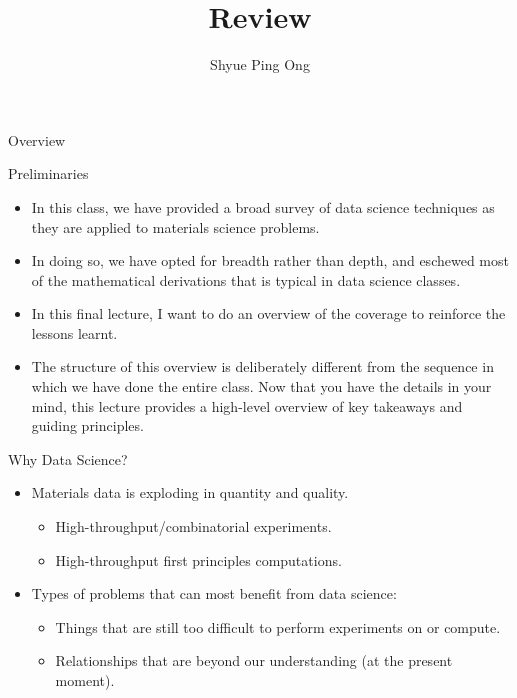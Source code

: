 \documentclass[aspectratio=169]{beamer}
\title[\classname Review]{\classname Review}
\author{Shyue Ping Ong}
\institute[UCSD]{Aiiso Yufeng Li Family Department of Chemical and Nano Engineering\\
University of California, San Diego\\\url{http://materialsvirtuallab.org}}
\date{}
\begin{document}
\begin{frame}
    \titlepage %
\end{frame}


\begin{frame}{Overview}
    \tableofcontents
\end{frame}

\begin{frame}{Preliminaries}
    \begin{itemize}
        \item In this class, we have provided a broad survey of data science techniques as they are applied to materials science problems.
        \item In doing so, we have opted for breadth rather than depth, and eschewed most of the mathematical derivations that is typical in data science classes.
        \item In this final lecture, I want to do an overview of the coverage to reinforce the lessons learnt.
        \item The structure of this overview is deliberately different from the sequence in which we have done the entire class. Now that you have the details in your mind, this lecture provides a high-level overview of key takeaways and guiding principles.
    \end{itemize}
\end{frame}


\begin{frame}{Why Data Science?}
    \begin{itemize}
        \item Materials data is exploding in quantity and quality.
        \begin{itemize}
            \item High-throughput/combinatorial experiments.
            \item High-throughput first principles computations.
        \end{itemize}
        \item Types of problems that can most benefit from data science:
        \begin{itemize}
            \item Things that are still too difficult to perform experiments on or compute.
            \item Relationships that are beyond our understanding (at the present moment).
        \end{itemize}
    \end{itemize}
\end{frame}
\end{document}

